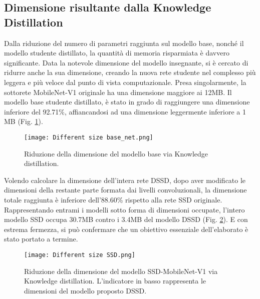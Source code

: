 \subsection{Dimensione risultante dalla Knowledge Distillation}
Dalla riduzione del numero di parametri raggiunta sul modello base, nonché 
il modello studente distillato, la quantità di memoria risparmiata è davvero 
significante. Data la notevole dimensione del modello insegnante, si è 
cercato di ridurre anche la sua dimensione, creando la nuova rete studente 
nel complesso più leggera e più veloce dal punto di vista computazionale. 
Presa singolarmente, la sottorete MobileNet-V1 originale ha una dimensione 
maggiore ai 12MB. Il modello base studente distillato, è stato in grado 
di raggiungere una dimensione inferiore del 92.71\%, affiancandosi ad una 
dimensione leggermente inferiore a 1 MB (Fig. \ref{base_dim}).
\begin{figure}
    \centering
    \texttt{[image: Different size base\_net.png]}
    \centering
    \caption{Riduzione della dimensione del modello base via Knowledge distillation.}
    \label{base_dim}
\end{figure}
Volendo calcolare 
la dimensione dell'intera rete DSSD, dopo aver modificato le dimensioni 
della restante parte formata dai livelli convoluzionali, la dimensione totale 
raggiunta è inferiore dell'88.60\% rispetto alla rete SSD originale. Rappresentando 
entrami i modelli sotto forma di dimensioni occupate, l'intero 
modello SSD occupa 30.7MB contro i 3.4MB del modello DSSD (Fig. \ref{SSD_dim_KD}). 
E con estrema fermezza, si può confermare che un obiettivo essenziale 
dell'elaborato è stato portato a termine.
\begin{figure}
    \centering
    \texttt{[image: Different size SSD.png]}
    \centering
    \caption{Riduzione della dimensione del modello SSD-MobileNet-V1 via Knowledge distillation. L'indicatore in basso rappresenta le dimensioni del modello proposto DSSD.}
    \label{SSD_dim_KD}
\end{figure}

